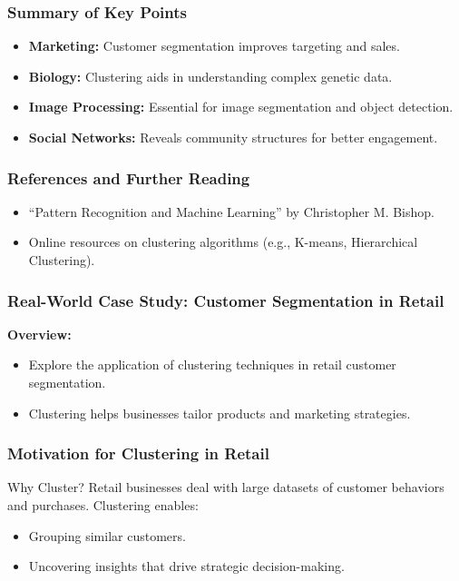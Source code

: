 \documentclass[aspectratio=169]{beamer}
\begin{document}
\begin{frame}[fragile]
    \frametitle{Summary of Key Points}
    \begin{itemize}
        \item \textbf{Marketing:} Customer segmentation improves targeting and sales.
        \item \textbf{Biology:} Clustering aids in understanding complex genetic data.
        \item \textbf{Image Processing:} Essential for image segmentation and object detection.
        \item \textbf{Social Networks:} Reveals community structures for better engagement.
    \end{itemize}
\end{frame}

\begin{frame}[fragile]
    \frametitle{References and Further Reading}
    \begin{itemize}
        \item “Pattern Recognition and Machine Learning” by Christopher M. Bishop.
        \item Online resources on clustering algorithms (e.g., K-means, Hierarchical Clustering).
    \end{itemize}
\end{frame}

\begin{frame}[fragile]
    \frametitle{Real-World Case Study: Customer Segmentation in Retail}
    \textbf{Overview:}
    \begin{itemize}
        \item Explore the application of clustering techniques in retail customer segmentation.
        \item Clustering helps businesses tailor products and marketing strategies.
    \end{itemize}
\end{frame}

\begin{frame}[fragile]
    \frametitle{Motivation for Clustering in Retail}
    \begin{block}{Why Cluster?}
        Retail businesses deal with large datasets of customer behaviors and purchases. Clustering enables:
    \end{block}
    \begin{itemize}
        \item Grouping similar customers.
        \item Uncovering insights that drive strategic decision-making.
    \end{itemize}
\end{frame}
\end{document}
